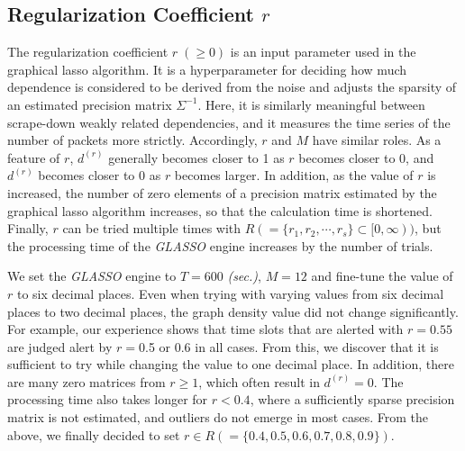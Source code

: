 \documentclass[conference]{IEEEtran}
\begin{document}
\subsection{Regularization Coefficient $r$}
The regularization coefficient $r\;(\geq 0)$ is an input parameter used in the graphical lasso algorithm.
It is a hyperparameter for deciding how much dependence is considered to be derived from the noise and adjusts the sparsity of an estimated precision matrix $\Sigma^{-1}$.
Here, it is similarly meaningful between scrape-down weakly related dependencies, and it measures the time series of the number of packets more strictly.
Accordingly, $r$ and $M$ have similar roles.
As a feature of $r$, $d^{(r)}$ generally becomes closer to 1 as $r$ becomes closer to 0, and $d^{(r)}$ becomes closer to 0 as $r$ becomes larger.
In addition, as the value of $r$ is increased, the number of zero elements of a precision matrix estimated by the graphical lasso algorithm increases, so that the calculation time is shortened.
Finally, $r$ can be tried multiple times with $R ( = \{r_1, r_2, \cdots, r_s\}\subset [0,\infty))$, but the processing time of the \textit{GLASSO} engine increases by the number of trials.

We set the \textit{GLASSO} engine to $T=600$ \textit{(sec.)}, $M=12$ and fine-tune the value of $r$ to six decimal places.
Even when trying with varying values from six decimal places to two decimal places, the graph density value did not change significantly.
For example, our experience shows that time slots that are alerted with $r=0.55$ are judged alert by $r=$0.5 or 0.6 in all cases.
From this, we discover that it is sufficient to try while changing the value to one decimal place.
In addition, there are many zero matrices from $r\geq 1$, which often result in $d^{(r)}=0$.
The processing time also takes longer for $r < 0.4$, where a sufficiently sparse precision matrix is not estimated, and outliers do not emerge in most cases.
From the above, we finally decided to set $r \in R ( = \{0.4, 0.5, 0.6, 0.7, 0.8, 0.9\})$.
\end{document}
